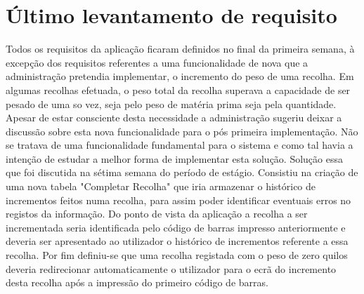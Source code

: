\section{Último levantamento de requisito}
Todos os requisitos da aplicação ficaram definidos no final da primeira semana, à excepção dos requisitos referentes a uma funcionalidade de nova que a administração pretendia implementar, o incremento do peso de uma recolha. Em algumas recolhas efetuada, o peso total da recolha superava a capacidade de ser pesado de uma so vez, seja pelo peso de matéria prima seja pela quantidade. Apesar de estar consciente desta necessidade a administração sugeriu deixar a discussão sobre esta nova funcionalidade para o pós primeira implementação. Não se tratava de uma funcionalidade fundamental para o sistema e como tal havia a intenção de estudar a melhor forma de implementar esta solução. Solução essa que foi discutida na sétima semana do período de estágio. Consistiu na criação de uma nova tabela "Completar Recolha" que iria armazenar o histórico de incrementos feitos numa recolha, para assim poder identificar eventuais erros no registos da informação. Do ponto de vista da aplicação a recolha a ser incrementada seria identificada pelo código de barras impresso anteriormente e deveria ser apresentado ao utilizador o histórico de incrementos referente a essa recolha. Por fim definiu-se que uma recolha registada com o peso de zero quilos deveria redirecionar automaticamente o utilizador para o ecrã do incremento desta recolha após a impressão do primeiro código de barras.

